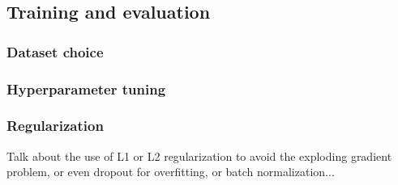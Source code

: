 \subsection{Training and evaluation}
	\subsubsection{Dataset choice}
	\subsubsection{Hyperparameter tuning}
	\subsubsection{Regularization}

Talk about the use of L1 or L2 regularization to avoid the exploding gradient
problem, or even dropout for overfitting, or batch normalization...
